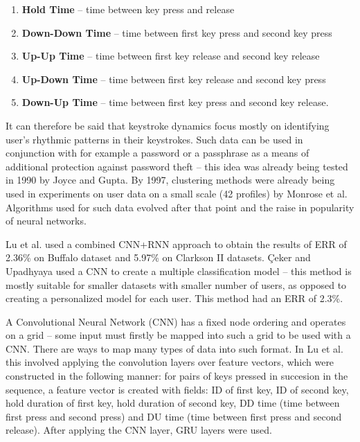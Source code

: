 \begin{enumerate}
    \item \textbf{Hold Time} -- time between key press and release
    \item \textbf{Down-Down Time} -- time between first key press and second key press
    \item \textbf{Up-Up Time} -- time between first key release and second key release
    \item \textbf{Up-Down Time} -- time between first key release and second key press
    \item \textbf{Down-Up Time} -- time between first key press and second key release.
\end{enumerate}

It can therefore be said that keystroke dynamics focus mostly on identifying user's rhythmic patterns in their keystrokes. Such data can be used in conjunction with for example a password or a passphrase as a means of additional protection against password theft -- this idea was already being tested in 1990 by Joyce and Gupta. \cite{joyce1990keystroke} By 1997, clustering methods were already being used in experiments on user data on a small scale (42 profiles) by Monrose et al. \cite{Monr1997} Algorithms used for such data evolved after that point and the raise in popularity of neural networks.

Lu et al. \cite{Lu2020} used a combined CNN+RNN approach to obtain the results of ERR of 2.36\% on Buffalo dataset and 5.97\% on Clarkson II datasets. Çeker and Upadhyaya \cite{ceker_cnn2017} used a CNN to create a multiple classification model -- this method is mostly suitable for smaller datasets with smaller number of users, as opposed to creating a personalized model for each user. This method had an ERR of 2.3\%. 

A Convolutional Neural Network (CNN) has a fixed node ordering and operates on a grid -- some input must firstly be mapped into such a grid to be used with a CNN. There are ways to map many types of data into such format. In Lu et al. this involved applying the convolution layers over feature vectors, which were constructed in the following manner: for pairs of keys pressed in succesion in the sequence, a feature vector is created with fields: ID of first key, ID of second key, hold duration of first key, hold duration of second key, DD time (time between first press and second press) and DU time (time between first press and second release). After applying the CNN layer, GRU layers were used.

